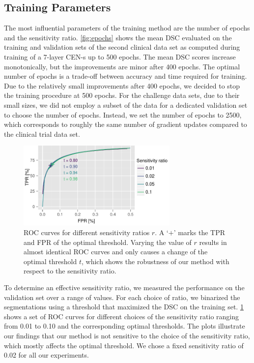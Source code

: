 \subsection[Training parameters]{Training Parameters}
\label{sec:trainparams}

The most influential parameters of the training method are the number of epochs
and the sensitivity ratio. \ref{fig:epochs} shows the mean DSC evaluated on
the training and validation sets of the second clinical data set as computed
during training of a \mbox{7-layer} CEN-s up to 500 epochs.
The mean DSC scores increase monotonically, but the improvements are minor after
400 epochs. The optimal number of epochs is a trade-off between accuracy and
time required for training. Due to the relatively small improvements after 400
epochs, we decided to stop the training procedure at 500 epochs. For the
challenge data sets, due to their small sizes, we did not employ a subset of the
data for a dedicated validation set to choose the number of epochs. Instead, we
set the number of epochs to 2500, which corresponds to roughly the same number
of gradient updates compared to the clinical trial data set.

\begin{figure}[tb]
\centering
\includegraphics[width=0.7\textwidth]{figures/tmi/roc2}
\caption[ROC curves for different sensitivity ratios $r$]{ROC curves for
different sensitivity ratios $r$. A `$+$' marks the TPR and FPR of the optimal
threshold. Varying the value of $r$ results in almost identical ROC curves and
only causes a change of the optimal threshold $t$, which shows the robustness of
our method with respect to the sensitivity ratio.}
\label{fig:ratio}
\end{figure}

To determine an effective sensitivity ratio, we measured the performance on the
validation set over a range of values. For each choice of ratio, we binarized
the segmentations using a threshold that maximized the DSC on the training set.
\ref{fig:ratio} shows a set of ROC curves for different choices of the
sensitivity ratio ranging from 0.01 to 0.10 and the corresponding optimal
thresholds. The plots illustrate our findings that our method is not sensitive
to the choice of the sensitivity ratio, which mostly affects the optimal
threshold. We chose a fixed sensitivity ratio of 0.02 for all our experiments.


